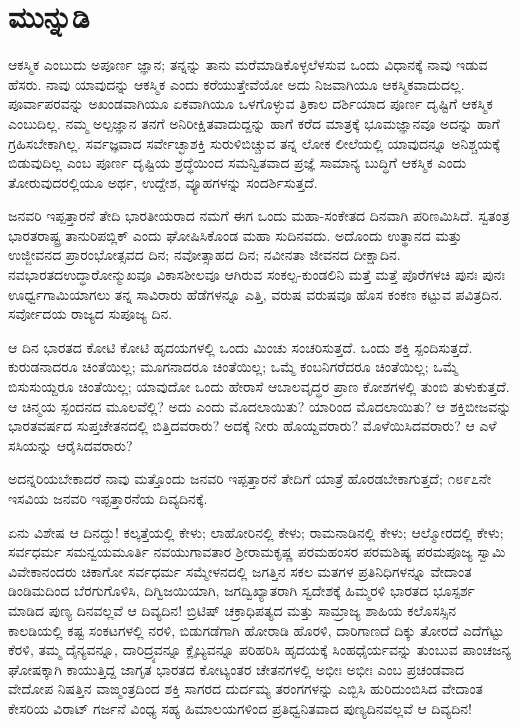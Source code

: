 
\chapter*{ಮುನ್ನುಡಿ}

ಆಕಸ್ಮಿಕ ಎಂಬುದು ಅಪೂರ್ಣ ಜ್ಞಾನ; ತನ್ನನ್ನು ತಾನು ಮರೆಮಾಡಿಕೊಳ್ಳಲೆಳಸುವ ಒಂದು ವಿಧಾನಕ್ಕೆ ನಾವು ಇಡುವ ಹೆಸರು. ನಾವು ಯಾವುದನ್ನು ಆಕಸ್ಮಿಕ ಎಂದು ಕರೆಯುತ್ತೇವೆಯೋ ಅದು ನಿಜವಾಗಿಯೂ ಆಕಸ್ಮಿಕವಾದುದಲ್ಲ. ಪೂರ್ವಾಪರವನ್ನು ಅಖಂಡವಾಗಿಯೂ ಏಕವಾಗಿಯೂ ಒಳಗೊಳ್ಳುವ ತ್ರಿಕಾಲ ದರ್ಶಿಯಾದ ಪೂರ್ಣ ದೃಷ್ಟಿಗೆ ಆಕಸ್ಮಿಕ ಎಂಬುದಿಲ್ಲ. ನಮ್ಮ ಅಲ್ಪಜ್ಞಾನ ತನಗೆ ಅನಿರೀಕ್ಷಿತವಾದುದ್ದನ್ನು ಹಾಗೆ ಕರೆದ ಮಾತ್ರಕ್ಕೆ ಭೂಮಜ್ಞಾನವೂ ಅದನ್ನು ಹಾಗೆ ಗ್ರಹಿಸಬೇಕಾಗಿಲ್ಲ. ಸರ್ವಜ್ಞವಾದ ಸರ್ವೇಚ್ಛಾಶಕ್ತಿ ಸುರುಳಿಬಿಚ್ಚುವ ತನ್ನ ಲೋಕ ಲೀಲೆಯಲ್ಲಿ ಯಾವುದನ್ನೂ ಅನಿಶ್ಚಯಕ್ಕೆ ಬಿಡುವುದಿಲ್ಲ ಎಂಬ ಪೂರ್ಣ ದೃಷ್ಟಿಯ ಶ್ರದ್ಧೆಯಿಂದ ಸಮನ್ವಿತವಾದ ಪ್ರಜ್ಞೆ ಸಾಮಾನ್ಯ ಬುದ್ಧಿಗೆ ಆಕಸ್ಮಿಕ ಎಂದು ತೋರುವುದರಲ್ಲಿಯೂ ಅರ್ಥ, ಉದ್ದೇಶ, ವ್ಯೂಹಗಳನ್ನು ಸಂದರ್ಶಿಸುತ್ತದೆ.

ಜನವರಿ ಇಪ್ಪತ್ತಾರನೆ ತೇದಿ ಭಾರತೀಯರಾದ ನಮಗೆ ಈಗ ಒಂದು ಮಹಾ-ಸಂಕೇತದ ದಿನವಾಗಿ ಪರಿಣಮಿಸಿದೆ. ಸ್ವತಂತ್ರ ಭಾರತರಾಷ್ಟ್ರ ತಾನುರಿಪಬ್ಲಿಕ್​ ಎಂದು ಘೋಷಿಸಿಕೊಂಡ ಮಹಾ ಸುದಿನವದು. ಅದೊಂದು ಉತ್ಥಾನದ ಮತ್ತು ಉಜ್ಜೀವನದ ಪ್ರಾರಂಭೋತ್ಸವದ ದಿನ; ನವೋತ್ಸಾಹದ ದಿನ; ನವೀನತಾ ಜೀವನದ ದೀಕ್ಷಾದಿನ. ನವಭಾರತದ\break ಉದ್ಧಾರೋನ್ಮುಖವೂ ವಿಕಾಸಶೀಲವೂ ಆಗಿರುವ ಸಂಕಲ್ಪ-ಕುಂಡಲಿನಿ ಮತ್ತೆ ಮತ್ತೆ ಪೊರೆಗಳಚಿ ಪುನಃ ಪುನಃ ಊರ್ಧ್ವಗಾಮಿಯಾಗಲು ತನ್ನ ಸಾವಿರಾರು ಹೆಡೆಗಳನ್ನೂ ಎತ್ತಿ, ವರುಷ ವರುಷವೂ ಹೊಸ ಕಂಕಣ ಕಟ್ಟುವ ಪವಿತ್ರದಿನ. ಸರ್ವೋದಯ ರಾಜ್ಯದ ಸುಪೂಜ್ಯ ದಿನ.

ಆ ದಿನ ಭಾರತದ ಕೋಟಿ ಕೋಟಿ ಹೃದಯಗಳಲ್ಲಿ ಒಂದು ಮಿಂಚು ಸಂಚರಿಸುತ್ತದೆ. ಒಂದು ಶಕ್ತಿ ಸ್ಪಂದಿಸುತ್ತದೆ. ಕುರುಡನಾದರೂ ಚಿಂತೆಯಿಲ್ಲ; ಮೂಗನಾದರೂ ಚಿಂತೆಯಿಲ್ಲ; ಒಮ್ಮೆ ಕಂಬನಿಗರೆದರೂ ಚಿಂತೆಯಿಲ್ಲ; ಒಮ್ಮೆ ಬಿಸುಸುಯ್ದರೂ ಚಿಂತೆಯಿಲ್ಲ; ಯಾವುದೋ ಒಂದು ಹೇರಾಸೆ ಆಬಾಲವೃದ್ಧರ ಪ್ರಾಣ ಕೋಶಗಳಲ್ಲಿ ತುಂಬಿ ತುಳುಕುತ್ತದೆ. ಆ ಚಿನ್ಮಯ ಸ್ಪಂದನದ ಮೂಲವೆಲ್ಲಿ? ಅದು ಎಂದು ಮೊದಲಾಯಿತು? ಯಾರಿಂದ ಮೊದಲಾಯಿತು? ಆ ಶಕ್ತಿಬೀಜವನ್ನು ಭಾರತವರ್ಷದ ಸುಪ್ತಚೇತನದಲ್ಲಿ ಬಿತ್ತಿದವರಾರು? ಅದಕ್ಕೆ ನೀರು ಹೊಯ್ದವರಾರು? ಮೊಳೆಯಿಸಿದವರಾರು? ಆ ಎಳೆ ಸಸಿಯನ್ನು ಆರೈಸಿದವರಾರು?

ಅದನ್ನರಿಯಬೇಕಾದರೆ ನಾವು ಮತ್ತೊಂದು ಜನವರಿ ಇಪ್ಪತ್ತಾರನೆ ತೇದಿಗೆ ಯಾತ್ರೆ ಹೊರಡಬೇಕಾಗುತ್ತದೆ; ೧೮೯೭ನೇ ಇಸವಿಯ ಜನವರಿ ಇಪ್ಪತ್ತಾರನೆಯ ದಿವ್ಯದಿನಕ್ಕೆ.

ಏನು ವಿಶೇಷ ಆ ದಿನದ್ದು! ಕಲ್ಕತ್ತೆಯಲ್ಲಿ ಕೇಳು; ಲಾಹೋರಿನಲ್ಲಿ ಕೇಳು; ರಾಮನಾಡಿನಲ್ಲಿ ಕೇಳು; ಆಲ್ಮೋರದಲ್ಲಿ ಕೇಳು; ಸರ್ವಧರ್ಮ ಸಮನ್ವಯಮೂರ್ತಿ ನವಯುಗಾವತಾರ ಶ‍್ರೀರಾಮಕೃಷ್ಣ ಪರಮಹಂಸರ ಪರಮಶಿಷ್ಯ ಪರಮಪೂಜ್ಯ ಸ್ವಾಮಿ ವಿವೇಕಾನಂದರು ಚಿಕಾಗೋ ಸರ್ವಧರ್ಮ ಸಮ್ಮೇಳನದಲ್ಲಿ ಜಗತ್ತಿನ ಸಕಲ ಮತಗಳ ಪ್ರತಿನಿಧಿಗಳನ್ನೂ ವೇದಾಂತ ಡಿಂಡಿಮದಿಂದ ಬೆರಗುಗೊಳಿಸಿ, ದಿಗ್ವಿಜಯಿಯಾಗಿ, ಜಗದ್ವಿಖ್ಯಾತರಾಗಿ ಸ್ವದೇಶಕ್ಕೆ ಹಿಮ್ಮರಳಿ ಭಾರತದ ಭೂಸ್ಪರ್ಶ ಮಾಡಿದ ಪುಣ್ಯ ದಿನವಲ್ಲವೆ ಆ ದಿವ್ಯದಿನ! ಬ್ರಿಟಿಷ್​ ಚಕ್ರಾಧಿಪತ್ಯದ ಮತ್ತು ಸಾಮ್ರಾಜ್ಯ ಶಾಹಿಯ ಕಲೊಸಸ್ಸಿನ ಕಾಲಡಿಯಲ್ಲಿ ಕಷ್ಟ ಸಂಕಟಗಳಲ್ಲಿ ನರಳಿ, ಬಿಡುಗಡೆಗಾಗಿ ಹೋರಾಡಿ ಹೊರಳಿ, ದಾರಿಗಾಣದೆ ದಿಕ್ಕು ತೋರದೆ ಎದೆಗೆಟ್ಟು ಕೆರಳಿ, ತಮ್ಮ ದೈನ್ಯವನ್ನೂ, ದಾರಿದ್ರ್ಯವನ್ನೂ ಕ್ಲೈಬ್ಯವನ್ನೂ ಪರಿಹರಿಸಿ ಹೃದಯಕ್ಕೆ ಸಿಂಹಧೈರ್ಯವನ್ನು ತುಂಬುವ ಪಾಂಚಜನ್ಯ ಘೋಷಕ್ಕಾಗಿ ಕಾಯುತ್ತಿದ್ದ ಜಾಗೃತ ಭಾರತದ ಕೋಟ್ಯಂತರ ಚೇತನಗಳಲ್ಲಿ ಅಭೀಃ ಅಭೀಃ ಎಂಬ ಪ್ರಚಂಡವಾದ ವೇದೋಪ ನಿಷತ್ತಿನ ವಾಙ್ಮಂತ್ರದಿಂದ ಶಕ್ತಿ ಸಾಗರದ ದುರ್ದಮ್ಯ ತರಂಗಗಳನ್ನು ಎಬ್ಬಿಸಿ ಹುರಿದುಂಬಿಸಿದ ವೇದಾಂತ ಕೇಸರಿಯ ವಿರಾಟ್​ ಗರ್ಜನೆ ವಿಂಧ್ಯ ಸಹ್ಯ ಹಿಮಾಲಯಗಳಿಂದ ಪ್ರತಿಧ್ವನಿತವಾದ ಪುಣ್ಯದಿನವಲ್ಲವೆ ಆ ದಿವ್ಯದಿನ!


